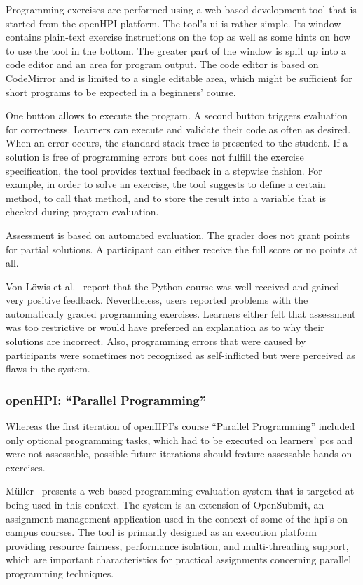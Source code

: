 Programming exercises are performed using a web-based development tool that is started from the openHPI platform. The tool's \gls{ui} is rather simple. Its window contains plain-text exercise instructions on the top as well as some hints on how to use the tool in the bottom. The greater part of the window is split up into a code editor and an area for program output. The code editor is based on CodeMirror and is limited to a single editable area, which might be sufficient for short programs to be expected in a beginners' course.

One button allows to execute the program. A second button triggers evaluation for correctness. Learners can execute and validate their code as often as desired. When an error occurs, the standard stack trace is presented to the student. If a solution is free of programming errors but does not fulfill the exercise specification, the tool provides textual feedback in a stepwise fashion. For example, in order to solve an exercise, the tool suggests to define a certain method, to call that method, and to store the result into a variable that is checked during program evaluation.

Assessment is based on automated evaluation. The grader does not grant points for partial solutions. A participant can either receive the full score or no points at all.

Von Löwis et al.~\cite{loewis2014scaling} report that the Python course was well received and gained very positive feedback. Nevertheless, users reported problems with the automatically graded programming exercises. Learners either felt that assessment was too restrictive or would have preferred an explanation as to why their solutions are incorrect. Also, programming errors that were caused by participants were sometimes not recognized as self-inflicted but were perceived as flaws in the system.

\subsubsection{openHPI: \texorpdfstring{“Parallel Programming”}{Parallel Programming}}

Whereas the first iteration of openHPI's course ``Parallel Programming'' included only optional programming tasks, which had to be executed on learners' \glspl{pc} and were not assessable, possible future iterations should feature assessable hands-on exercises.

Müller~\cite{mueller2014security} presents a web-based programming evaluation system that is targeted at being used in this context. The system is an extension of OpenSubmit, an assignment management application used in the context of some of the \gls{hpi}'s on-campus courses. The tool is primarily designed as an execution platform providing resource fairness, performance isolation, and multi-threading support, which are important characteristics for practical assignments concerning parallel programming techniques.

